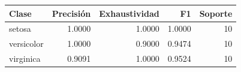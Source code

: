\begin{tabular}{lrrrr}
\toprule
Clase & Precisión & Exhaustividad & F1 & Soporte \\
\midrule
setosa & 1.0000 & 1.0000 & 1.0000 & 10 \\
versicolor & 1.0000 & 0.9000 & 0.9474 & 10 \\
virginica & 0.9091 & 1.0000 & 0.9524 & 10 \\
\bottomrule
\end{tabular}
